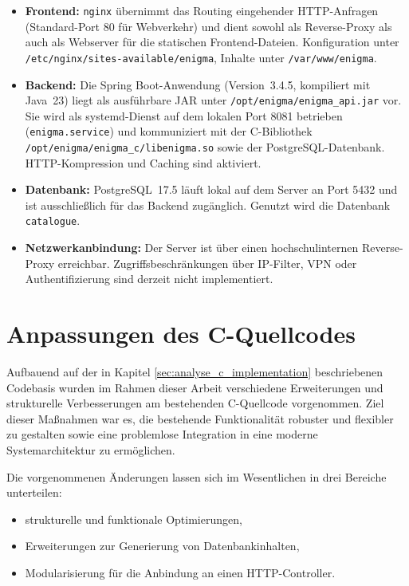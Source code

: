 \documentclass[12pt, ngerman, a4paper, numbers=noenddot]{article}
\begin{document}
\begin{itemize}
	\item \textbf{Frontend:} \lstinline|nginx| übernimmt das Routing eingehender HTTP-Anfragen (Stan\-dard-Port 80 für Webverkehr) und dient sowohl als Reverse-Proxy als auch als Webserver für die statischen Frontend-Dateien. Konfiguration unter \lstinline|/etc/nginx/sites-available/enigma|, Inhalte unter \lstinline|/var/www/enigma|.	
	
	\item \textbf{Backend:} Die Spring Boot-Anwendung (Version~3.4.5, kompiliert mit Java~23) liegt als ausführbare JAR unter \lstinline|/opt/enigma/enigma_api.jar| vor. Sie wird als systemd-Dienst auf dem lokalen Port 8081 betrieben (\lstinline|enigma.service|) und kommuniziert mit der C-Bibliothek \newline \lstinline|/opt/enigma/enigma_c/libenigma.so| sowie der PostgreSQL-Datenbank. HTTP-Kompression und Caching sind aktiviert.
	
	\item \textbf{Datenbank:} PostgreSQL~17.5 läuft lokal auf dem Server an Port 5432 und ist ausschließlich für das Backend zugänglich. Genutzt wird die Datenbank \lstinline|catalogue|.
	
	\item \textbf{Netzwerkanbindung:} Der Server ist über einen hochschulinternen Reverse-Proxy erreichbar. Zugriffsbeschränkungen über IP-Filter, VPN oder Authentifizierung sind derzeit nicht implementiert.
\end{itemize}


\newpage
\section{Anpassungen des C-Quellcodes}
\label{sec:c_modifications}

Aufbauend auf der in Kapitel \ref{sec:analyse_c_implementation} beschriebenen Codebasis wurden im Rahmen dieser Arbeit verschiedene Erweiterungen und strukturelle Verbesserungen am bestehenden C-Quellcode vorgenommen. Ziel dieser Maßnahmen war es, die bestehende Funktionalität robuster und flexibler zu gestalten sowie eine problemlose Integration in eine moderne Systemarchitektur zu ermöglichen.

Die vorgenommenen Änderungen lassen sich im Wesentlichen in drei Bereiche unterteilen:
\begin{itemize}
	\item strukturelle und funktionale Optimierungen,
	\item Erweiterungen zur Generierung von Datenbankinhalten,
	\item Modularisierung für die Anbindung an einen HTTP-Controller.
\end{itemize}
\end{document}
